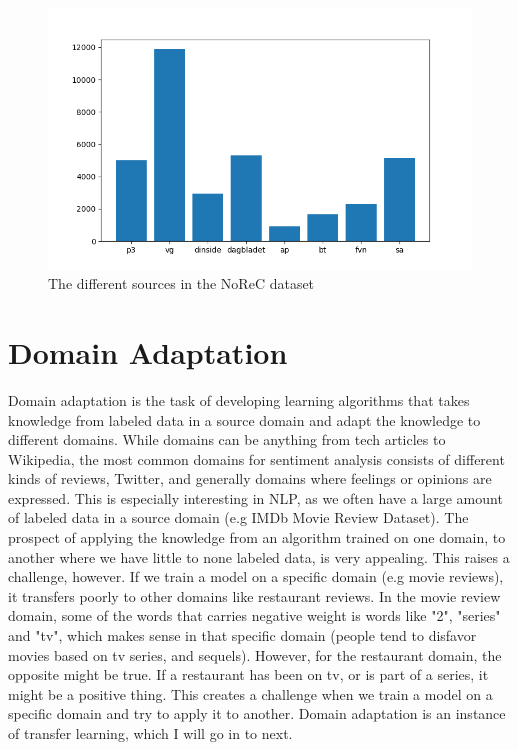 \documentclass{report}
\begin{document}
\begin{figure}[h!]
	\centering
	\includegraphics[scale=0.5]{img/src_dist}
	\caption{The different sources in the NoReC dataset}
	\label{fig:sources}
\end{figure}%

\section{Domain Adaptation}
Domain adaptation is the task of developing learning algorithms that takes knowledge from labeled data in a source domain and adapt the knowledge to different domains. While domains can be anything from tech articles to Wikipedia, the most common domains for sentiment analysis consists of different kinds of reviews, Twitter, and generally domains where feelings or opinions are expressed. This is especially interesting in NLP, as we often have a large amount of labeled data in a source domain (e.g IMDb Movie Review Dataset). The prospect of applying the knowledge from an algorithm trained on one domain, to another where we have little to none labeled data, is very appealing. This raises a challenge, however. If we train a model on a specific domain (e.g movie reviews), it transfers poorly to other domains like restaurant reviews. In the movie review domain, some of the words that carries negative weight is words like "2", "series" and "tv", which makes sense in that specific domain (people tend to disfavor movies based on tv series, and sequels). However, for the restaurant domain, the opposite might be true. If a restaurant has been on tv, or is part of a series, it might be a positive thing. This creates a challenge when we train a model on a specific domain and try to apply it to another. Domain adaptation is an instance of transfer learning, which I will go in to next.
\end{document}
